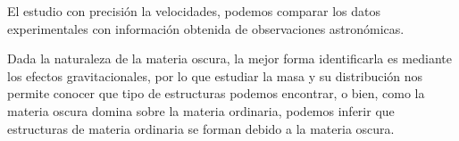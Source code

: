 El estudio con precisión la velocidades, podemos comparar los datos experimentales con información obtenida de observaciones astronómicas.

Dada la naturaleza de la materia oscura, la mejor forma identificarla es mediante los efectos gravitacionales, por lo que estudiar la masa y su distribución nos permite conocer que tipo de estructuras podemos encontrar, o bien, como la materia oscura domina sobre la materia ordinaria, podemos inferir que estructuras de materia ordinaria se forman debido a la materia oscura.

%
%
%

